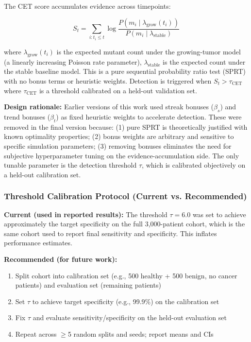 \documentclass[10pt,a4paper]{article}
\begin{document}
The CET score accumulates evidence across timepoints:

\begin{equation}
S_t = \sum_{i: t_i \leq t} \log \frac{P(m_i \mid \lambda_{\text{grow}}(t_i))}{P(m_i \mid \lambda_{\text{stable}})}
\end{equation}

where $\lambda_{\text{grow}}(t_i)$ is the expected mutant count under the growing-tumor model (a linearly increasing Poisson rate parameter), $\lambda_{\text{stable}}$ is the expected count under the stable baseline model. This is a pure sequential probability ratio test (SPRT) with no bonus terms or heuristic weights. Detection is triggered when $S_t > \tau_{\text{CET}}$ where $\tau_{\text{CET}}$ is a threshold calibrated on a held-out validation set.

\textbf{Design rationale:} Earlier versions of this work used streak bonuses ($\beta_s$) and trend bonuses ($\beta_t$) as fixed heuristic weights to accelerate detection. These were removed in the final version because: (1) pure SPRT is theoretically justified with known optimality properties; (2) bonus weights are arbitrary and sensitive to specific simulation parameters; (3) removing bonuses eliminates the need for subjective hyperparameter tuning on the evidence-accumulation side. The only tunable parameter is the detection threshold $\tau$, which is calibrated objectively on a held-out calibration set.

\subsubsection{Threshold Calibration Protocol (Current vs. Recommended)}

\textbf{Current (used in reported results):} The threshold $\tau = 6.0$ was set to achieve approximately the target specificity on the full 3,000-patient cohort, which is the same cohort used to report final sensitivity and specificity. This inflates performance estimates.

\textbf{Recommended (for future work):} 
\begin{enumerate}
\item Split cohort into calibration set (e.g., 500 healthy + 500 benign, no cancer patients) and evaluation set (remaining patients)
\item Set $\tau$ to achieve target specificity (e.g., 99.9\%) on the calibration set
\item Fix $\tau$ and evaluate sensitivity/specificity on the held-out evaluation set
\item Repeat across $\geq$5 random splits and seeds; report means and CIs
\end{enumerate}
\end{document}
